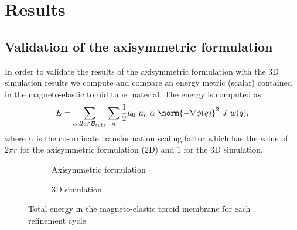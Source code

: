 \section{Results}
\subsection{Validation of the axisymmetric formulation}
In order to validate the results of the axisymmetric formulation with the 3D simulation results we compute and compare an energy metric (scalar) contained in the magneto-elastic toroid tube material. The energy is computed as
\begin{equation}
E = \sum\limits_{cells \in \mathcal{B}_{tube}} \sum\limits_{q} \frac{1}{2} \mu_0 \ \mu_r \ \alpha \ \norm{-\nabla \phi(q)}^2 \ J \ w(q),
\end{equation}
where $\alpha$ is the co-ordinate transformation scaling factor which has the value of $2 \pi r$ for the axisymmetric formulation (2D) and 1 for the 3D simulation.\par 

\begin{figure}[t!]
\begin{subfigure}[t]{0.49\linewidth}
\centering
{}
\caption{Axisymmetric formulation}
\label{fig:1.4.1}
\end{subfigure}
\begin{subfigure}[t]{0.46\linewidth}
\centering
{}
\caption{3D simulation}
\label{fig:1.4.2}
\end{subfigure}
\caption{Total energy in the magneto-elastic toroid membrane for each refinement cycle}
\label{fig:1.4}
\end{figure} \par 


